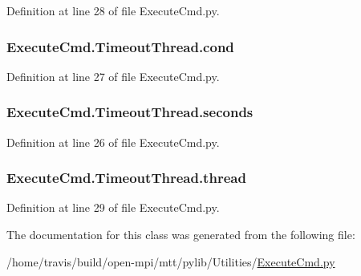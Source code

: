 Definition at line 28 of file Execute\-Cmd.\-py.

\hypertarget{class_execute_cmd_1_1_timeout_thread_ac654287e1bf651a90f45dd968e9d3c76}{
\subsubsection[{cond}]{\setlength{\rightskip}{0pt plus 5cm}Execute\-Cmd.\-Timeout\-Thread.\-cond}}\label{class_execute_cmd_1_1_timeout_thread_ac654287e1bf651a90f45dd968e9d3c76}


Definition at line 27 of file Execute\-Cmd.\-py.

\hypertarget{class_execute_cmd_1_1_timeout_thread_a93a3a333cc928cf7009ace5b8b568722}{
\subsubsection[{seconds}]{\setlength{\rightskip}{0pt plus 5cm}Execute\-Cmd.\-Timeout\-Thread.\-seconds}}\label{class_execute_cmd_1_1_timeout_thread_a93a3a333cc928cf7009ace5b8b568722}


Definition at line 26 of file Execute\-Cmd.\-py.

\hypertarget{class_execute_cmd_1_1_timeout_thread_ae8c4ccc5d51f3383f5e53c556f27cc7a}{
\subsubsection[{thread}]{\setlength{\rightskip}{0pt plus 5cm}Execute\-Cmd.\-Timeout\-Thread.\-thread}}\label{class_execute_cmd_1_1_timeout_thread_ae8c4ccc5d51f3383f5e53c556f27cc7a}


Definition at line 29 of file Execute\-Cmd.\-py.



The documentation for this class was generated from the following file\-:\begin{DoxyCompactItemize}
\item 
/home/travis/build/open-\/mpi/mtt/pylib/\-Utilities/\hyperlink{_execute_cmd_8py}{Execute\-Cmd.\-py}\end{DoxyCompactItemize}
